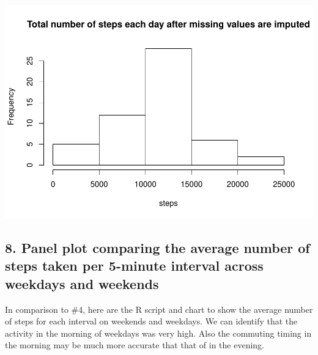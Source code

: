 \documentclass[]{article}
\begin{document}
\includegraphics{PA1_template_files/figure-latex/unnamed-chunk-6-1.pdf}

\subsection{8. Panel plot comparing the average number of steps taken
per 5-minute interval across weekdays and
weekends}\label{panel-plot-comparing-the-average-number-of-steps-taken-per-5-minute-interval-across-weekdays-and-weekends}

In comparison to \#4, here are the R script and chart to show the
average number of steps for each interval on weekends and weekdays. We
can identify that the activity in the morning of weekdays was very high.
Also the commuting timing in the morning may be much more accurate that
that of in the evening.
\end{document}
